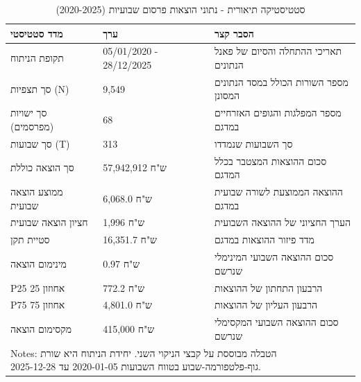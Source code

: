 \begin{table}[!htbp]
\centering
\caption{סטטיסטיקה תיאורית - נתוני הוצאות פרסום שבועיות (2020-2025)}
\label{tab:sample_statistics_he}
\begin{tabular}{lll}
\hline\hline
מדד סטטיסטי & ערך & הסבר קצר \\
\hline
תקופת הניתוח & 05/01/2020 - 28/12/2025 & תאריכי ההתחלה והסיום של פאנל הנתונים \\
סך תצפיות (N) & 9,549 & מספר השורות הכולל במסד הנתונים המסונן \\
סך ישויות (מפרסמים) & 68 & מספר המפלגות והגופים האזרחיים במדגם \\
סך שבועות (T) & 313 & סך השבועות שנמדדו \\
סך הוצאה כוללת & 57,942,912 ש"ח & סכום ההוצאות המצטבר בכלל המדגם \\
ממוצע הוצאה שבועית & 6,068.0 ש"ח & ההוצאה הממוצעת לשורה שבועית במדגם \\
חציון הוצאה שבועית & 1,996 ש"ח & הערך החציוני של ההוצאה השבועית \\
סטיית תקן & 16,351.7 ש"ח & מדד פיזור ההוצאות במדגם \\
מינימום הוצאה & 0.97 ש"ח & סכום ההוצאה השבועי המינימלי שנרשם \\
P25 אחוזון 25 & 772.2 ש"ח & הרבעון התחתון של ההוצאות \\
P75 אחוזון 75 & 4,801.0 ש"ח & הרבעון העליון של ההוצאות \\
מקסימום הוצאה & 415,000 ש"ח & סכום ההוצאה השבועי המקסימלי שנרשם \\
\hline
\multicolumn{3}{l}{\footnotesize Notes: הטבלה מבוססת על קבצי הניקוי השני. יחידת הניתוח היא שורת גוף-פלטפורמה-שבוע בטווח השבועות 2020-01-05 עד 2025-12-28.}\\
\hline\hline
\end{tabular}
\end{table}
